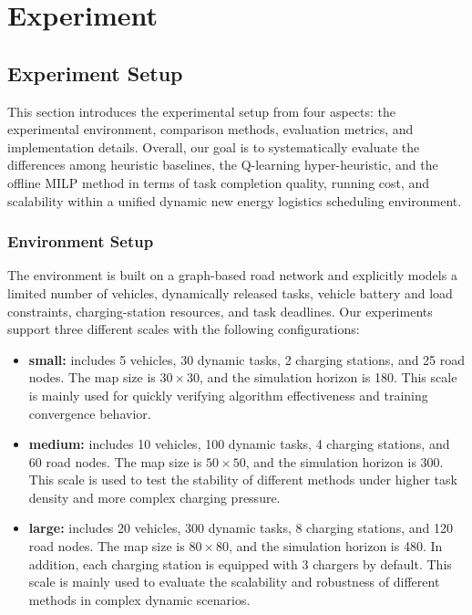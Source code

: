 \section{Experiment}
\subsection{Experiment Setup}
This section introduces the experimental setup from four aspects: the experimental environment, comparison methods, evaluation metrics, and implementation details. Overall, our goal is to systematically evaluate the differences among heuristic baselines, the Q-learning hyper-heuristic, and the offline MILP method in terms of task completion quality, running cost, and scalability within a unified dynamic new energy logistics scheduling environment.
\subsubsection{Environment Setup}
The environment is built on a graph-based road network and explicitly models a limited number of vehicles, dynamically released tasks, vehicle battery and load constraints, charging-station resources, and task deadlines. Our experiments support three different scales with the following configurations:

\begin{itemize}
    \item \textbf{small:}  includes 5 vehicles, 30 dynamic tasks, 2 charging stations, and 25 road nodes. The map size is \(30\times 30\), and the simulation horizon is 180. This scale is mainly used for quickly verifying algorithm effectiveness and training convergence behavior.
    
    \item \textbf{medium:}  includes 10 vehicles, 100 dynamic tasks, 4 charging stations, and 60 road nodes. The map size is \(50\times 50\), and the simulation horizon is 300. This scale is used to test the stability of different methods under higher task density and more complex charging pressure.
    
    \item \textbf{large:} includes 20 vehicles, 300 dynamic tasks, 8 charging stations, and 120 road nodes. The map size is \(80\times 80\), and the simulation horizon is 480. In addition, each charging station is equipped with 3 chargers by default. This scale is mainly used to evaluate the scalability and robustness of different methods in complex dynamic scenarios.
\end{itemize}


